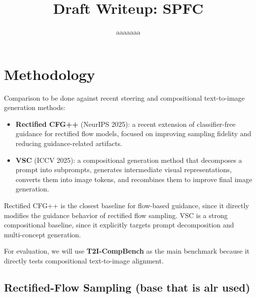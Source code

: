 \documentclass[letterpaper]{article} %
\title{Draft Writeup: SPFC}
\author{
    aaaaaaa
}
\begin{document}
\maketitle

\section{Methodology}

Comparison to be done against recent steering and compositional text-to-image generation methods:

\begin{itemize}
    \item \textbf{Rectified CFG++} (NeurIPS 2025): a recent extension of classifier-free guidance for rectified flow models, focused on improving sampling fidelity and reducing guidance-related artifacts.
    \item \textbf{VSC} (ICCV 2025): a compositional generation method that decomposes a prompt into subprompts, generates intermediate visual representations, converts them into image tokens, and recombines them to improve final image generation.
\end{itemize}

Rectified CFG++ is the closest baseline for flow-based guidance, since it directly modifies the guidance behavior of rectified flow sampling. VSC is a strong compositional baseline, since it explicitly targets prompt decomposition and multi-concept generation.

For evaluation, we will use \textbf{T2I-CompBench} as the main benchmark because it directly tests compositional text-to-image alignment. 

\subsection{Rectified-Flow Sampling (base that is alr used)}
\end{document}
